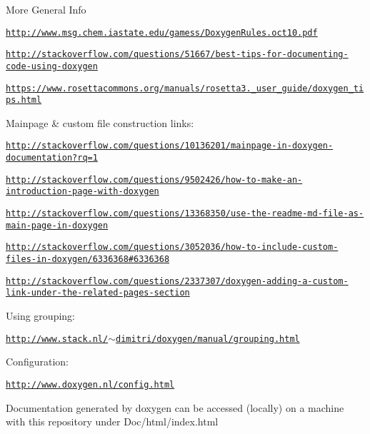 More General Info
\begin{DoxyItemize}
\item \href{http://www.msg.chem.iastate.edu/gamess/DoxygenRules.oct10.pdf}{\tt http\+://www.\+msg.\+chem.\+iastate.\+edu/gamess/\+Doxygen\+Rules.\+oct10.\+pdf}
\item \href{http://stackoverflow.com/questions/51667/best-tips-for-documenting-code-using-doxygen}{\tt http\+://stackoverflow.\+com/questions/51667/best-\/tips-\/for-\/documenting-\/code-\/using-\/doxygen}
\item \href{https://www.rosettacommons.org/manuals/rosetta3.2_user_guide/doxygen_tips.html}{\tt https\+://www.\+rosettacommons.\+org/manuals/rosetta3.\+\_\+user\+\_\+guide/doxygen\+\_\+tips.\+html}
\end{DoxyItemize}

Mainpage \& custom file construction links\+:
\begin{DoxyItemize}
\item \href{http://stackoverflow.com/questions/10136201/mainpage-in-doxygen-documentation?rq=1}{\tt http\+://stackoverflow.\+com/questions/10136201/mainpage-\/in-\/doxygen-\/documentation?rq=1}
\item \href{http://stackoverflow.com/questions/9502426/how-to-make-an-introduction-page-with-doxygen}{\tt http\+://stackoverflow.\+com/questions/9502426/how-\/to-\/make-\/an-\/introduction-\/page-\/with-\/doxygen}
\item \href{http://stackoverflow.com/questions/13368350/use-the-readme-md-file-as-main-page-in-doxygen}{\tt http\+://stackoverflow.\+com/questions/13368350/use-\/the-\/readme-\/md-\/file-\/as-\/main-\/page-\/in-\/doxygen}
\item \href{http://stackoverflow.com/questions/3052036/how-to-include-custom-files-in-doxygen/6336368#6336368}{\tt http\+://stackoverflow.\+com/questions/3052036/how-\/to-\/include-\/custom-\/files-\/in-\/doxygen/6336368\#6336368}
\item \href{http://stackoverflow.com/questions/2337307/doxygen-adding-a-custom-link-under-the-related-pages-section}{\tt http\+://stackoverflow.\+com/questions/2337307/doxygen-\/adding-\/a-\/custom-\/link-\/under-\/the-\/related-\/pages-\/section}
\end{DoxyItemize}

Using grouping\+:
\begin{DoxyItemize}
\item \href{http://www.stack.nl/~dimitri/doxygen/manual/grouping.html}{\tt http\+://www.\+stack.\+nl/$\sim$dimitri/doxygen/manual/grouping.\+html}
\end{DoxyItemize}

Configuration\+:
\begin{DoxyItemize}
\item \href{http://www.doxygen.nl/config.html}{\tt http\+://www.\+doxygen.\+nl/config.\+html}
\end{DoxyItemize}

Documentation generated by doxygen can be accessed (locally) on a machine with this repository under Doc/html/index.\+html 